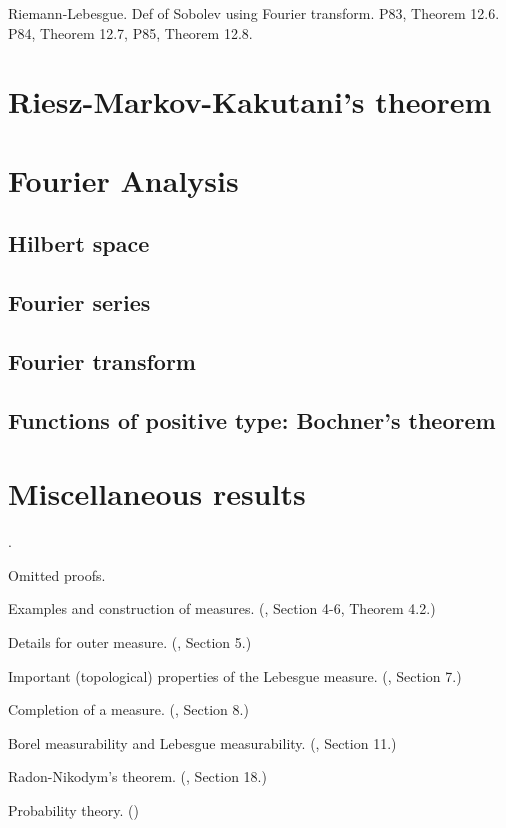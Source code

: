 \documentclass[openany, a4paper, oneside]{book}
\newcounter{enum2}
\renewenvironment{enumerate}{%
\begin{list}%
{%
\arabic{enum2}.\ \,%
}%
{%
\usecounter{enum2}
\setlength{\itemindent}{0pt}%
\setlength{\leftmargin}{6pt}%
\setlength{\rightmargin}{0pt}%
\setlength{\labelsep}{0pt}%
\setlength{\labelwidth}{6pt}%
\setlength{\itemsep}{0pt}%
\setlength{\parsep}{0pt}%
\setlength{\listparindent}{0pt}%
}
}{%
\end{list}%
}
\theoremstyle{break}
\theoremstyle{breakdefn}
\begin{document}
Riemann-Lebesgue.
Def of Sobolev using Fourier transform.
P83, Theorem 12.6.
P84, Theorem 12.7,
P85, Theorem 12.8.
\section{Riesz-Markov-Kakutani's theorem}
\label{sec-7-1-10}
\section{Fourier Analysis}
\label{sec-7-1-11}
\subsection{Hilbert space}
\label{sec-7-1-11-1}
\subsection{Fourier series}
\label{sec-7-1-11-2}
\subsection{Fourier transform}
\label{sec-7-1-11-3}
\subsection{Functions of positive type: Bochner's theorem}
\label{sec-7-1-11-4}
\section{Miscellaneous results}
\label{sec-7-1-12}

\begin{enumerate}
\item Omitted proofs.
\item Examples and construction of measures. (\cite{SeizoIto1}, Section 4-6, Theorem 4.2.)
\item Details for outer measure. (\cite{SeizoIto1}, Section 5.)
\item Important (topological) properties of the Lebesgue measure. (\cite{SeizoIto1}, Section 7.)
\item Completion of a measure. (\cite{SeizoIto1}, Section 8.)
\item Borel measurability and Lebesgue measurability. (\cite{SeizoIto1}, Section 11.)
\item Radon-Nikodym's theorem. (\cite{SeizoIto1}, Section 18.)
\item Probability theory. (\cite{DavidWilliams1, TadahisaFunaki1})
\end{enumerate}
\end{document}
